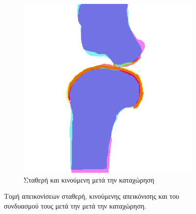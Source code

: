 \documentclass[a4paper,12pt]{article}
\begin{document}
\begin{figure}[H]
    \begin{subfigure}[t]{0.4\linewidth}
    \includegraphics[width=\linewidth]{combination_label_after_registration_1.png}
    \caption{Σταθερή και κινούμενη μετά την καταχώρηση}
    \end{subfigure}

    \caption{Τομή απεικονίσεων σταθερή, κινούμενης απεικόνισης και του
             συνδυασμού τους μετά την μετά την καταχώρηση.}
    \label{fig:registration_after:1}
\end{figure}
\end{document}
